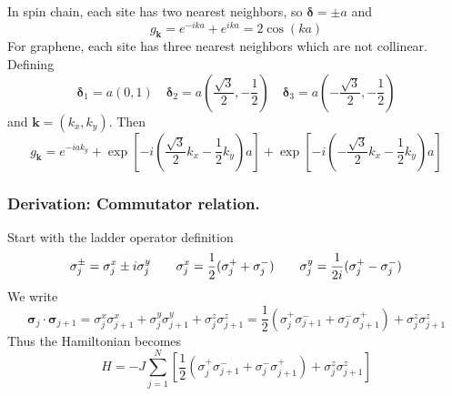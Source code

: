 \documentclass[../../../main.tex]{subfiles}
\begin{document}
In spin chain, each site has two nearest neighbors, so $\boldsymbol{\delta}= \pm a$ and
\begin{equation*}
    g_\mathbf{k} = e^{-ika}+e^{ika}=2\cos(ka)
\end{equation*}
For graphene, each site has three nearest neighbors which are not collinear.
Defining
\begin{equation*}
    \boldsymbol{\delta}_1 = a(0,1)\quad
    \boldsymbol{\delta}_2 = a\left(\frac{\sqrt{3}}{2},-\frac{1}{2}\right)\quad
    \boldsymbol{\delta}_3 = a\left(-\frac{\sqrt{3}}{2},-\frac{1}{2}\right)
\end{equation*}
and $\mathbf{k} = (k_x,k_y)$.
Then
\begin{equation*}
    g_{\mathbf{k}} = e^{-i a k_y } +\exp \left[ -i\left(\frac{\sqrt{3}}{2}k_x-\frac{1}{2}k_y\right)a \right] + \exp \left[ -i\left(-\frac{\sqrt{3}}{2}k_x-\frac{1}{2}k_y\right)a \right]
\end{equation*}


\subsubsection{Derivation: Commutator relation.}
Start with the ladder operator definition
\begin{equation*}
    \sigma_j^{\pm} = \sigma_{j}^{x} \pm i \sigma_{j}^{y}
    \qquad
    \sigma_j^{x} = \frac{1}{2}(\sigma_j^{+} + \sigma_j^{-})
    \qquad
    \sigma_j^{y} = \frac{1}{2i}(\sigma_j^{+} - \sigma_j^{-}) \\
\end{equation*}
We write
\begin{equation*}
    \boldsymbol{\sigma}_j \cdot \boldsymbol{\sigma}_{j+1}
    =  \sigma_j^x \sigma_{j+1}^x + \sigma_j^y \sigma_{j+1}^y + \sigma_j^z \sigma_{j+1}^z
    = \frac{1}{2} \left( \sigma_j^{+}\sigma_{j+1}^{-} + \sigma_j^{-}\sigma_{j+1}^{+} \right)+ \sigma_j^z \sigma_{j+1}^z
\end{equation*}
Thus the Hamiltonian becomes
\begin{equation*}
    H
    = -J \sum_{j=1}^{N}
    \left[
        \frac{1}{2} \left( \sigma_j^{+}\sigma_{j+1}^{-} + \sigma_j^{-}\sigma_{j+1}^{+} \right)+ \sigma_j^z \sigma_{j+1}^z
        \right]
\end{equation*}
\end{document}
